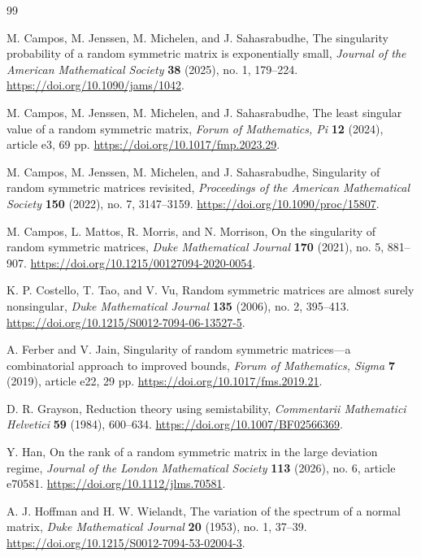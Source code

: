 \begin{thebibliography}{99}

M. Campos, M. Jenssen, M. Michelen, and J. Sahasrabudhe,
The singularity probability of a random symmetric matrix is exponentially small,
\emph{Journal of the American Mathematical Society} \textbf{38} (2025),
no. 1, 179--224.
\url{https://doi.org/10.1090/jams/1042}.

M. Campos, M. Jenssen, M. Michelen, and J. Sahasrabudhe,
The least singular value of a random symmetric matrix,
\emph{Forum of Mathematics, Pi} \textbf{12} (2024), article e3, 69 pp.
\url{https://doi.org/10.1017/fmp.2023.29}.

M. Campos, M. Jenssen, M. Michelen, and J. Sahasrabudhe,
Singularity of random symmetric matrices revisited,
\emph{Proceedings of the American Mathematical Society} \textbf{150}
(2022), no. 7, 3147--3159.
\url{https://doi.org/10.1090/proc/15807}.

M. Campos, L. Mattos, R. Morris, and N. Morrison,
On the singularity of random symmetric matrices,
\emph{Duke Mathematical Journal} \textbf{170} (2021), no. 5, 881--907.
\url{https://doi.org/10.1215/00127094-2020-0054}.

K. P. Costello, T. Tao, and V. Vu,
Random symmetric matrices are almost surely nonsingular,
\emph{Duke Mathematical Journal} \textbf{135} (2006), no. 2, 395--413.
\url{https://doi.org/10.1215/S0012-7094-06-13527-5}.

A. Ferber and V. Jain,
Singularity of random symmetric matrices---a combinatorial approach to improved bounds,
\emph{Forum of Mathematics, Sigma} \textbf{7} (2019), article e22, 29 pp.
\url{https://doi.org/10.1017/fms.2019.21}.

D. R. Grayson,
Reduction theory using semistability,
\emph{Commentarii Mathematici Helvetici} \textbf{59} (1984), 600--634.
\url{https://doi.org/10.1007/BF02566369}.

Y. Han,
On the rank of a random symmetric matrix in the large deviation regime,
\emph{Journal of the London Mathematical Society} \textbf{113} (2026),
no. 6, article e70581.
\url{https://doi.org/10.1112/jlms.70581}.

A. J. Hoffman and H. W. Wielandt,
The variation of the spectrum of a normal matrix,
\emph{Duke Mathematical Journal} \textbf{20} (1953), no. 1, 37--39.
\url{https://doi.org/10.1215/S0012-7094-53-02004-3}.


\end{thebibliography}
